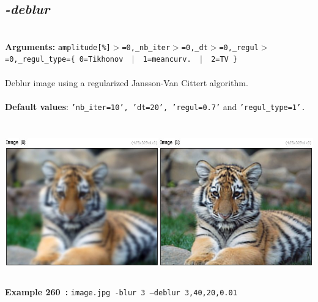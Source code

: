 \documentclass[a4paper,11pt,twoside]{book}
\begin{document}
\subsection{\emph{-deblur} }\vspace*{-0.5em}
~\\\textbf{Arguments: } 
{\small \texttt{amplitude[\%]$>$=0,\_nb\_iter$>$=0,\_dt$>$=0,\_regul$>$=0,\_regul\_type=\{ 0=Tikhonov ~$|$~ 1=meancurv. ~$|$~ 2=TV \}}}\\~\\
Deblur image using a regularized Jansson-Van Cittert algorithm.
~\\~\\\textbf{Default values}: {\small \texttt{'nb\_iter=10', 'dt=20', 'regul=0.7'} and \texttt{'regul\_type=1'.}}
\begin{center}\includegraphics[keepaspectratio=true,height=7cm,width=\textwidth]{img/gmic_def260.jpg}\\
{\footnotesize \textbf{Example 260~:} \texttt{image.jpg -blur 3 --deblur 3,40,20,0.01}}
\end{center}
\end{document}
